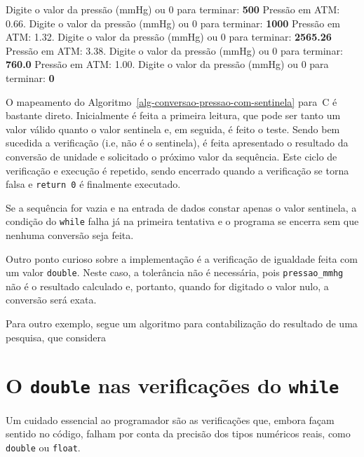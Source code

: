 \documentclass[
  11pt,
  a4paper,
]{scrbook}
\newenvironment{Shaded}{\begin{snugshade}}{\end{snugshade}}
\newcommand{\KeywordTok}[1]{\textcolor[rgb]{0.13,0.29,0.53}{\textbf{#1}}}
\newcommand{\NormalTok}[1]{#1}
\begin{document}
\begin{Shaded}
\begin{Highlighting}[]
\NormalTok{Digite o valor da pressão (mmHg) ou 0 para terminar: }\KeywordTok{ 500 }
\NormalTok{Pressão em ATM: 0.66.}
\NormalTok{Digite o valor da pressão (mmHg) ou 0 para terminar: }\KeywordTok{ 1000 }
\NormalTok{Pressão em ATM: 1.32.}
\NormalTok{Digite o valor da pressão (mmHg) ou 0 para terminar: }\KeywordTok{ 2565.26 }
\NormalTok{Pressão em ATM: 3.38.}
\NormalTok{Digite o valor da pressão (mmHg) ou 0 para terminar: }\KeywordTok{ 760.0 }
\NormalTok{Pressão em ATM: 1.00.}
\NormalTok{Digite o valor da pressão (mmHg) ou 0 para terminar: }\KeywordTok{ 0 }
\end{Highlighting}
\end{Shaded}

O mapeamento do Algoritmo~\ref{alg-conversao-pressao-com-sentinela}
para~C é bastante direto. Inicialmente é feita a primeira leitura, que
pode ser tanto um valor válido quanto o valor sentinela e, em seguida, é
feito o teste. Sendo bem sucedida a verificação (i.e, não é o
sentinela), é feita apresentado o resultado da conversão de unidade e
solicitado o próximo valor da sequência. Este ciclo de verificação e
execução é repetido, sendo encerrado quando a verificação se torna falsa
e \texttt{return\ 0} é finalmente executado.

Se a sequência for vazia e na entrada de dados constar apenas o valor
sentinela, a condição do \texttt{while} falha já na primeira tentativa e
o programa se encerra sem que nenhuma conversão seja feita.

Outro ponto curioso sobre a implementação é a verificação de igualdade
feita com um valor \texttt{double}. Neste caso, a tolerância não é
necessária, pois \texttt{pressao\_mmhg} não é o resultado calculado e,
portanto, quando for digitado o valor nulo, a conversão será exata.

Para outro exemplo, segue um algoritmo para contabilização do resultado
de uma pesquisa, que considera

\section{\texorpdfstring{O \texttt{double} nas verificações do
\texttt{while}}{O double nas verificações do while}}\label{o-double-nas-verificauxe7uxf5es-do-while}

Um cuidado essencial ao programador são as verificações que, embora
façam sentido no código, falham por conta da precisão dos tipos
numéricos reais, como \texttt{double} ou \texttt{float}.
\end{document}
